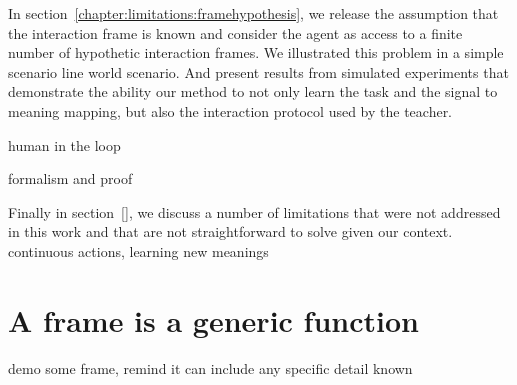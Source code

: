In section~\ref{chapter:limitations:framehypothesis}, we release the assumption that the interaction frame is known and consider the agent as access to a finite number of hypothetic interaction frames. We illustrated this problem in a simple scenario line world scenario. And present results from simulated experiments that demonstrate the ability our method to not only learn the task and the signal to meaning mapping, but also the interaction protocol used by the teacher.

human in the loop

formalism and proof


Finally in section~\ref{}, we discuss a number of limitations that were not addressed in this work and that are not straightforward to solve given our context. continuous actions, learning new meanings








\section{A frame is a generic function}
\label{chapter:limitations:framegeneric}

demo some frame, remind it can include any specific detail known






